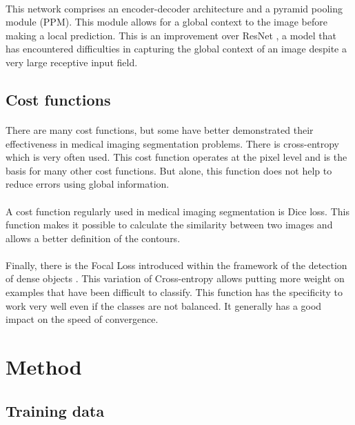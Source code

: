 \documentclass[english]{article}
\begin{document}
\paragraph{}
This network comprises an encoder-decoder architecture and a pyramid pooling module (PPM). This module allows for a global context to the image before making a local prediction. This is an improvement over ResNet \cite{ResNet}, a model that has encountered difficulties in capturing the global context of an image despite a very large receptive input field.

\subsection{Cost functions}
\paragraph{}
There are many cost functions, but some have better demonstrated their effectiveness in medical imaging segmentation problems. There is cross-entropy which is very often used. This cost function operates at the pixel level and is the basis for many other cost functions. But alone, this function does not help to reduce errors using global information.
\paragraph{}
A cost function regularly used in medical imaging segmentation is Dice loss. This function makes it possible to calculate the similarity between two images and allows a better definition of the contours.
\paragraph{}
Finally, there is the Focal Loss introduced within the framework of the detection of dense objects \cite{Focal-Loss}. This variation of Cross-entropy allows putting more weight on examples that have been difficult to classify. This function has the specificity to work very well even if the classes are not balanced. It generally has a good impact on the speed of convergence.


\section{Method}
\label{method}

\subsection{Training data}
\end{document}
